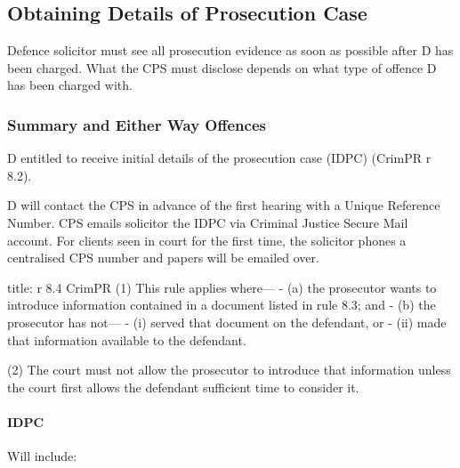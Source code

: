 \documentclass[
]{article}
\newenvironment{Shaded}{}{}
\newcommand{\NormalTok}[1]{#1}
\begin{document}
\hypertarget{obtaining-details-of-prosecution-case}{%
\subsection{Obtaining Details of Prosecution
Case}\label{obtaining-details-of-prosecution-case}}

Defence solicitor must see all prosecution evidence as soon as possible
after D has been charged. What the CPS must disclose depends on what
type of offence D has been charged with.

\hypertarget{summary-and-either-way-offences}{%
\subsubsection{Summary and Either Way
Offences}\label{summary-and-either-way-offences}}

D entitled to receive initial details of the prosecution case (IDPC)
(CrimPR r 8.2).

D will contact the CPS in advance of the first hearing with a Unique
Reference Number. CPS emails solicitor the IDPC via Criminal Justice
Secure Mail account. For clients seen in court for the first time, the
solicitor phones a centralised CPS number and papers will be emailed
over.

\begin{Shaded}
\begin{Highlighting}[]
\NormalTok{title: r 8.4 CrimPR}
\NormalTok{(1) This rule applies where—}
\NormalTok{{-} (a) the prosecutor wants to introduce information contained in a document listed in rule 8.3; and}
\NormalTok{{-} (b) the prosecutor has not—}
\NormalTok{    {-} (i) served that document on the defendant, or}
\NormalTok{    {-} (ii) made that information available to the defendant.}

\NormalTok{(2) The court must not allow the prosecutor to introduce that information unless the court first allows the defendant sufficient time to consider it. }
\end{Highlighting}
\end{Shaded}

\hypertarget{idpc}{%
\paragraph{IDPC}\label{idpc}}

Will include:
\end{document}

